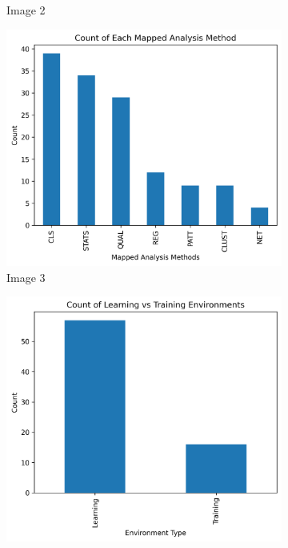 \documentclass[manuscript,screen,review]{acmart}
\begin{document}
\begin{figure}[h!]
\begin{subfigure}[b]{0.45\textwidth}
        \caption{Image 2}
    \end{subfigure}
    \hfill
    \begin{subfigure}[b]{0.45\textwidth}
        \includegraphics[width=\textwidth]{img/statistical_imgs/analysis_type.png}
        \caption{Image 3}
    \end{subfigure}
    \hfill
    \begin{subfigure}[b]{0.45\textwidth}
        \includegraphics[width=\textwidth]{img/statistical_imgs/learning_vs_training_envs.png}

\end{subfigure}
\end{figure}
\end{document}
